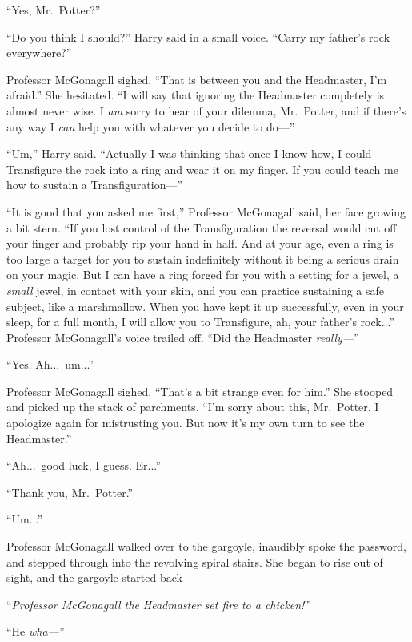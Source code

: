 “Yes, Mr.~Potter?”

“Do you think I should?” Harry said in a small voice. “Carry my father’s rock everywhere?”

Professor McGonagall sighed. “That is between you and the Headmaster, I’m afraid.” She hesitated. “I will say that ignoring the Headmaster completely is almost never wise. I \emph{am} sorry to hear of your dilemma, Mr.~Potter, and if there’s any way I \emph{can} help you with whatever you decide to do—”

“Um,” Harry said. “Actually I was thinking that once I know how, I could Transfigure the rock into a ring and wear it on my finger. If you could teach me how to sustain a Transfiguration—”

“It is good that you asked me first,” Professor McGonagall said, her face growing a bit stern. “If you lost control of the Transfiguration the reversal would cut off your finger and probably rip your hand in half. And at your age, even a ring is too large a target for you to sustain indefinitely without it being a serious drain on your magic. But I can have a ring forged for you with a setting for a jewel, a \emph{small} jewel, in contact with your skin, and you can practice sustaining a safe subject, like a marshmallow. When you have kept it up successfully, even in your sleep, for a full month, I will allow you to Transfigure, ah, your father’s rock...” Professor McGonagall’s voice trailed off. “Did the Headmaster \emph{really—}”

“Yes. Ah...\ um...”

Professor McGonagall sighed. “That’s a bit strange even for him.” She stooped and picked up the stack of parchments. “I’m sorry about this, Mr.~Potter. I apologize again for mistrusting you. But now it’s my own turn to see the Headmaster.”

“Ah...\ good luck, I guess. Er...”

“Thank you, Mr.~Potter.”

“Um...”

Professor McGonagall walked over to the gargoyle, inaudibly spoke the password, and stepped through into the revolving spiral stairs. She began to rise out of sight, and the gargoyle started back—

“\emph{Professor McGonagall the Headmaster set fire to a chicken!”}

“He \emph{wha—}”


